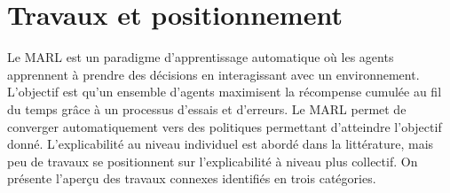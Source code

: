 \documentclass[demonstration]{jfsma}
\newcommand{\probP}{\text{I\kern-0.15em P}}
\newcommand{\jp}[1]{\textbf{\color{red} JPJ: #1}}
\begin{document}







\section{Travaux et positionnement}

Le MARL est un paradigme d'apprentissage automatique où les agents apprennent à prendre des décisions en interagissant avec un environnement. L’objectif est qu'un ensemble d'agents maximisent la récompense cumulée au fil du temps grâce à un processus d’essais et d’erreurs.
Le MARL permet de converger automatiquement vers des politiques permettant d'atteindre l'objectif donné. L'explicabilité au niveau individuel est abordé dans la littérature, mais peu de travaux se positionnent sur l'explicabilité à niveau plus collectif.
On présente l'aperçu des travaux connexes identifiés en trois catégories.
\end{document}
